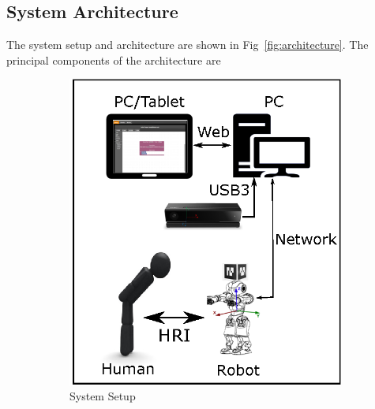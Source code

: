 \documentclass{llncs}
\begin{document}
\subsection{System Architecture}
The system setup and architecture are shown in Fig~\ref{fig:architecture}.
The principal components of the architecture are
\begin{figure}
\centering
\begin{subfigure}[t]{0.46\textwidth}
\includegraphics[width=\textwidth]{../thesis/assets/system_setup.eps}
\caption[System Setup]{System Setup}
\end{subfigure}
\begin{subfigure}[t]{0.48\textwidth}

\end{subfigure}
\end{figure}
\end{document}
